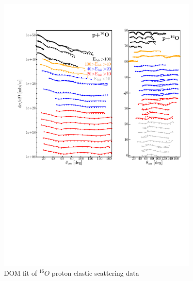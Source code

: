 \begin{figure}
\begin{center}
\includegraphics[width = 0.9\textwidth]{figures/o16_protonElastic.png}
\caption{DOM fit of $^{16}O$ proton elastic scattering data}
\label{o16ProtonElastic}
\end{center}
\end{figure}

